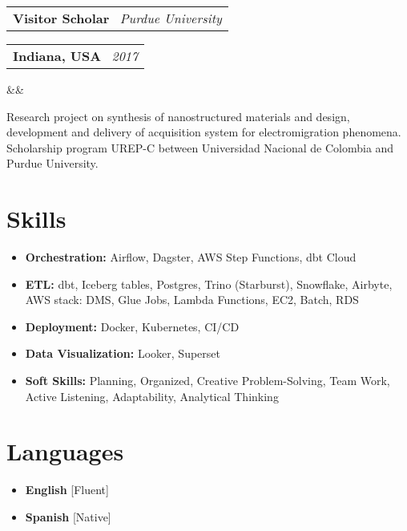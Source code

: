 \documentclass[11pt,a4paper,sans]{moderncv}
\makeatletter
\newcommand*{\customcventry}[7][.13em]{
\begin{tabular}{@{}l}
{\bfseries #4} \
{\itshape #3}
\end{tabular}
\hfill
\begin{tabular}{l@{}}
{\bfseries #5} \
{\itshape #2}
\end{tabular}
\ifx&#7&%
\else{\
\begin{minipage}{\maincolumnwidth}%
\small#7%
\end{minipage}}\fi%
\par\addvspace{#1}}
\makeatother
\begin{document}
\customcventry{2017}{Purdue University}{Visitor Scholar}{Indiana, USA}{}{}
{Research project on synthesis of nanostructured materials and design, development and delivery of acquisition system for electromigration phenomena. Scholarship program UREP-C between Universidad Nacional de Colombia and Purdue University.}

\section{Skills}
{\begin{itemize}[label=\textbullet]
\setlength\itemsep{-0.2cm}
\item {\textbf{Orchestration:} Airflow, Dagster, AWS Step Functions, dbt Cloud}
\item {\textbf{ETL:} dbt, Iceberg tables, Postgres, Trino (Starburst), Snowflake, Airbyte, AWS stack: DMS, Glue Jobs, Lambda Functions, EC2, Batch, RDS}
\item {\textbf{Deployment:} Docker, Kubernetes, CI/CD}
\item {\textbf{Data Visualization:} Looker, Superset }
\item {\textbf{Soft Skills:} Planning, Organized, Creative Problem-Solving, Team Work, Active Listening, Adaptability, Analytical Thinking}
\end{itemize}}
\vspace*{-8mm}
\section{Languages}
\begin{multicols}{2}
    \begin{itemize}[leftmargin=0.6cm, label=\textbullet, noitemsep]
    \item \textbf{English} [Fluent]
    \item {\textbf{Spanish} [Native]}
    \end{itemize}
\end{multicols}
\end{document}
